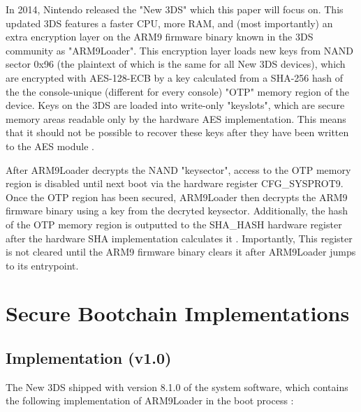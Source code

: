 \documentclass[journal]{IEEEtran}
\begin{document}
In 2014, Nintendo released the "New 3DS" which this paper will focus on. This
updated 3DS features a faster CPU, more RAM, and (most importantly) an extra
encryption layer on the ARM9 firmware binary known in the 3DS community as
"ARM9Loader". This encryption layer loads new keys from NAND sector 0x96 (the
plaintext of which is the same for all New 3DS devices), which are encrypted
with AES-128-ECB by a key calculated from a SHA-256 hash of the the
console-unique (different for every console) "OTP" memory region of the device.
Keys on the 3DS are loaded into write-only "keyslots", which are secure memory
areas readable only by the hardware AES implementation. This means that it
should not be possible to recover these keys after they have been written to the
AES module \cite{AES_Registers}.

After ARM9Loader decrypts the NAND "keysector", access to the OTP memory region
is disabled until next boot via the hardware register CFG\_SYSPROT9. Once the
OTP region has been secured, ARM9Loader then decrypts the ARM9 firmware binary
using a key from the decryted keysector. Additionally, the hash of the OTP
memory region is outputted to the SHA\_HASH hardware register after the hardware
SHA implementation calculates it \cite{SHA_Registers}. Importantly, This
register is not cleared until the ARM9 firmware binary clears it after
ARM9Loader jumps to its entrypoint.

\section{Secure Bootchain Implementations}

\subsection{Implementation (v1.0)}

The New 3DS shipped with version 8.1.0 of the system software, which contains
the following implementation of ARM9Loader in the boot process \cite{FIRM}:
\end{document}
